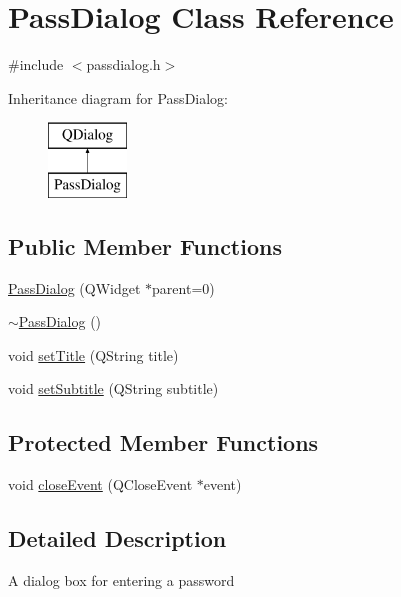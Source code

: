 \hypertarget{class_pass_dialog}{\section{Pass\+Dialog Class Reference}
\label{class_pass_dialog}
}


{\ttfamily \#include $<$passdialog.\+h$>$}

Inheritance diagram for Pass\+Dialog\+:\begin{figure}[H]
\begin{center}
\leavevmode
\includegraphics[height=2.000000cm]{class_pass_dialog}
\end{center}
\end{figure}
\subsection*{Public Member Functions}
\begin{DoxyCompactItemize}
\item 
\hyperlink{class_pass_dialog_a2ba0457b15a0ca80f5bb39945890b970}{Pass\+Dialog} (Q\+Widget $\ast$parent=0)
\item 
\hyperlink{class_pass_dialog_ac277cb5dfd04a02e7748a18ae795391f}{$\sim$\+Pass\+Dialog} ()
\item 
void \hyperlink{class_pass_dialog_a85ef04b8b6e869bcf548138b48965b2d}{set\+Title} (Q\+String title)
\item 
void \hyperlink{class_pass_dialog_a9637b02f31c2b9b955a2f274f115f30b}{set\+Subtitle} (Q\+String subtitle)
\end{DoxyCompactItemize}
\subsection*{Protected Member Functions}
\begin{DoxyCompactItemize}
\item 
void \hyperlink{class_pass_dialog_aa1c0796d9caef2bc58365d1304361d89}{close\+Event} (Q\+Close\+Event $\ast$event)
\end{DoxyCompactItemize}


\subsection{Detailed Description}
A dialog box for entering a password 

